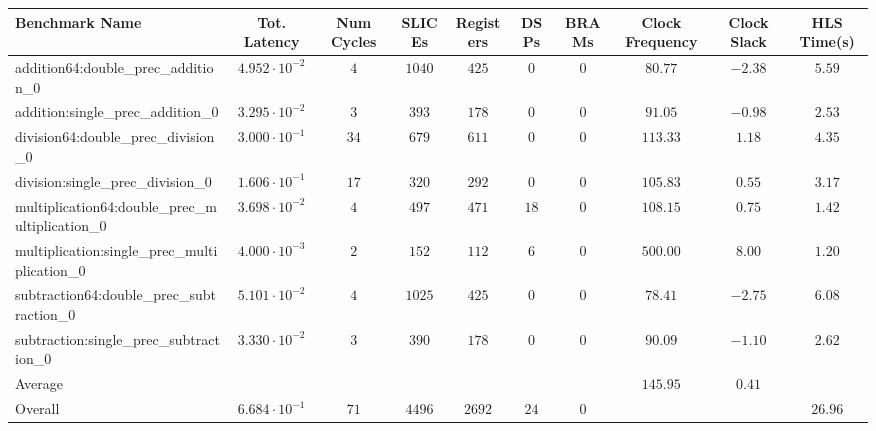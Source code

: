 \begin{tabular}{|l|c|c|c|c|c|c|c|c|c|}
\hline
Benchmark Name                                   & Tot. Latency            & Num Cycles & SLICEs   & Registers & DSPs   & BRAMs & Clock Frequency & Clock Slack & HLS Time(s) \\
\hline
addition64:double\_prec\_addition\_0             & $ 4.952 \cdot 10^{-2} $ & $ 4      $ & $ 1040 $ & $ 425   $ & $ 0  $ & $ 0 $ & $ 80.77       $ & $ -2.38   $ & $ 5.59    $ \\
addition:single\_prec\_addition\_0               & $ 3.295 \cdot 10^{-2} $ & $ 3      $ & $ 393  $ & $ 178   $ & $ 0  $ & $ 0 $ & $ 91.05       $ & $ -0.98   $ & $ 2.53    $ \\
division64:double\_prec\_division\_0             & $ 3.000 \cdot 10^{-1} $ & $ 34     $ & $ 679  $ & $ 611   $ & $ 0  $ & $ 0 $ & $ 113.33      $ & $ 1.18    $ & $ 4.35    $ \\
division:single\_prec\_division\_0               & $ 1.606 \cdot 10^{-1} $ & $ 17     $ & $ 320  $ & $ 292   $ & $ 0  $ & $ 0 $ & $ 105.83      $ & $ 0.55    $ & $ 3.17    $ \\
multiplication64:double\_prec\_multiplication\_0 & $ 3.698 \cdot 10^{-2} $ & $ 4      $ & $ 497  $ & $ 471   $ & $ 18 $ & $ 0 $ & $ 108.15      $ & $ 0.75    $ & $ 1.42    $ \\
multiplication:single\_prec\_multiplication\_0   & $ 4.000 \cdot 10^{-3} $ & $ 2      $ & $ 152  $ & $ 112   $ & $ 6  $ & $ 0 $ & $ 500.00      $ & $ 8.00    $ & $ 1.20    $ \\
subtraction64:double\_prec\_subtraction\_0       & $ 5.101 \cdot 10^{-2} $ & $ 4      $ & $ 1025 $ & $ 425   $ & $ 0  $ & $ 0 $ & $ 78.41       $ & $ -2.75   $ & $ 6.08    $ \\
subtraction:single\_prec\_subtraction\_0         & $ 3.330 \cdot 10^{-2} $ & $ 3      $ & $ 390  $ & $ 178   $ & $ 0  $ & $ 0 $ & $ 90.09       $ & $ -1.10   $ & $ 2.62    $ \\
\hline
Average                                          & $                     $ & $        $ & $      $ & $       $ & $    $ & $   $ & $ 145.95      $ & $ 0.41    $ & $         $ \\
\hline
Overall                                          & $ 6.684 \cdot 10^{-1} $ & $ 71     $ & $ 4496 $ & $ 2692  $ & $ 24 $ & $ 0 $ & $             $ & $         $ & $ 26.96   $ \\
\hline
\end{tabular}
